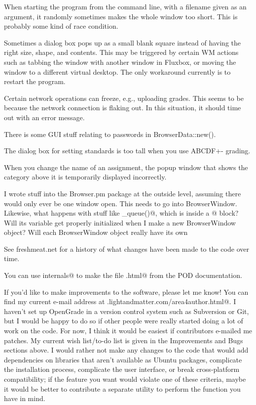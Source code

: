 \documentclass{opengrade_doc}
\begin{document}
When starting the program from the command line, with a filename given as
an argument, it randomly sometimes makes the whole window too short. This
is probably some kind of race condition.

Sometimes a dialog box pops up as a small blank square instead of having
the right size, shape, and contents. This may be triggered by certain
WM actions such as tabbing the window with another window in Fluxbox,
or moving the window to a different virtual desktop. The only workaround
currently is to restart the program.

Certain network operations can freeze, e.g., uploading grades. This seems
to be because the network connection is flaking out. In this situation,
it should time out with an error message.

There is some GUI stuff relating to passwords in BrowserData::new().

The dialog box for setting standards is too tall when you use
ABCDF+- grading.

When you change the name of an assignment, the popup window that shows
the category above it is temporarily displayed incorrectly.

I wrote stuff into the Browser.pm package at the outside level, assuming
there would only ever be one window open. This needs to go into
BrowserWindow. Likewise, what happens with stuff like \verb@grades_queue()@,
 which
is inside a \verb@BEGIN{}@ block? Will its variable get properly initialized when I
make a new BrowserWindow object? Will each BrowserWindow object really have its
own \verb@%queue@?

\label{programming}
See freshmeat.net for a history of what changes have been made to the
code over time.

You can use \verb@make internals@ to make the file \verb@internals.html@ from the
POD documentation.

If you'd like to make improvements to the software, please let me know!
You can find my current e-mail address at
\verb@www.lightandmatter.com/area4author.html@.
I haven't set up OpenGrade in a version control system such as Subversion or Git, but I would be happy to do so if
other people were really started doing a lot of work on the code.
For now, I think it would be easiest if contributors e-mailed me
patches. My current wish list/to-do list is given in the
Improvements and Bugs sections above. I would rather not make
any changes to the code that would add dependencies on
libraries that aren't available as Ubuntu packages, complicate the installation process, complicate the
user interface, or break cross-platform compatibility; if the feature
you want would violate one of these criteria, maybe it would be
better to contribute a separate utility to perform the function you
have in mind.
\end{document}
